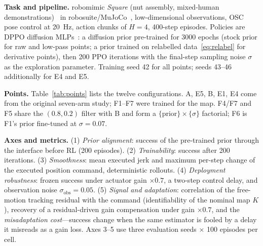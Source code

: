 \documentclass[conference]{IEEEtran}
\begin{document}
\textbf{Task and pipeline.} robomimic \emph{Square} (nut assembly, mixed-human demonstrations)~\cite{mandlekar2021robomimic} in robosuite/MuJoCo~\cite{zhu2020robosuite}, low-dimensional observations, OSC pose control at \SI{20}{Hz}, action chunks of $H=4$, 400-step episodes. Policies are DPPO diffusion MLPs~\cite{ren2024diffusionpolicypolicyoptimization}: a diffusion prior pre-trained for 3000 epochs (stock prior for raw and low-pass points; a prior trained on relabelled data~\eqref{eq:relabel} for derivative points), then 200 PPO iterations with the final-step sampling noise $\sigma$ as the exploration parameter. Training seed 42 for all points; seeds 43--46 additionally for E4 and E5.

\textbf{Points.} Table~\ref{tab:points} lists the twelve configurations. A, E5, B, E1, E4 come from the original seven-arm study; F1--F7 were trained for the map. F4/F7 and F5 share the $(0.8,0.2)$ filter with B and form a $\{\text{prior}\}\times\{\sigma\}$ factorial; F6 is F1's prior fine-tuned at $\sigma=0.07$.

\textbf{Axes and metrics.} (1) \emph{Prior alignment}: success of the pre-trained prior through the interface before RL (200 episodes). (2) \emph{Trainability}: success after 200 iterations. (3) \emph{Smoothness}: mean executed jerk and maximum per-step change of the executed position command, deterministic rollouts. (4) \emph{Deployment robustness}: frozen success under actuator gain $\times0.7$, a two-step control delay, and observation noise $\sigma_{\text{obs}}=0.05$. (5) \emph{Signal and adaptation}: correlation of the free-motion tracking residual with the command (identifiability of the nominal map $K$), recovery of a residual-driven gain compensation under gain $\times0.7$, and the \emph{misadaptation cost}---success change when the same estimator is fooled by a delay it misreads as a gain loss. Axes 3--5 use three evaluation seeds $\times$ 100 episodes per cell.
\end{document}
